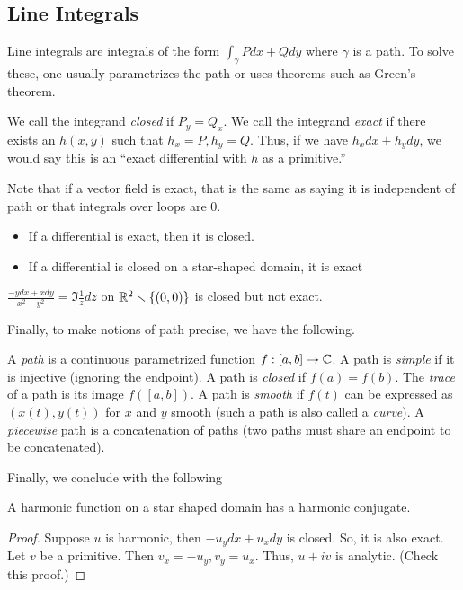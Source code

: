 \documentclass[11pt,leqno,oneside]{amsart}
\begin{document}
  \subsection{Line Integrals}
  Line integrals are integrals of the form $\int_\gamma Pdx + Qdy$ where
  $\gamma$ is a path. To solve these, one usually parametrizes the path or uses
  theorems such as Green's theorem.
  \begin{defn}
    We call the integrand \emph{closed} if $P_y = Q_x$. We call the integrand
    \emph{exact} if there exists an $h(x,y)$ such that $h_x = P, h_y = Q$. Thus,
    if we have $h_xdx+h_ydy$, we would say this is an ``exact differential with
    $h$ as a primitive.''
  \end{defn}
  Note that if a vector field is exact, that is the same as saying it is
  independent of path or that integrals over loops are 0.
  \begin{rmk}
    \begin{itemize}
    \item If a differential is exact, then it is closed.
    \item If a differential is closed on a star-shaped domain, it is exact
    \end{itemize}
  \end{rmk}
  \begin{example}
    $\frac{-ydx+xdy}{x^2+y^2} = \Im \frac{1}{z}dz$ on ${\mathbb R}^2 \smallsetminus
    \{(0,0)\}$ is closed but not exact.
  \end{example}
  Finally, to make notions of path precise, we have the following.
\begin{defn}
    A \emph{path} is a continuous parametrized function $f:[a,b] \to {\mathbb C}$.  A
    path is \emph{simple} if it is injective (ignoring the endpoint).  A path is
    \emph{closed} if $f(a) = f(b)$.  The \emph{trace} of a path is its image
    $f([a,b])$.  A path is \emph{smooth} if $f(t)$ can be expressed as $(x(t),
    y(t))$ for $x$ and $y$ smooth (such a path is also called a \emph{curve}).
    A \emph{piecewise} path is a concatenation of paths (two paths must share an
    endpoint to be concatenated).
  \end{defn}

  Finally, we conclude with the following
  \begin{thm}
    A harmonic function on a star shaped domain has a harmonic conjugate.
  \end{thm}
  \begin{proof}
    Suppose $u$ is harmonic, then $-u_ydx+u_xdy$ is closed. So, it is also
    exact. Let $v$ be a primitive. Then $v_x = -u_y, v_y=u_x$. Thus, $u+iv$ is
    analytic. (Check this proof.)
  \end{proof}
\end{document}
